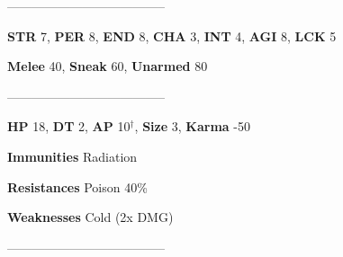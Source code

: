 \documentclass[11pt,a4paper,twocolumn]{book}
\begin{document}
	--------------------------------------

	\noindent
	\textbf{STR} 7, \textbf{PER} 8, \textbf{END} 8, \textbf{CHA} 3, \textbf{INT} 4, \textbf{AGI} 8, \textbf{LCK} 5
	
	\noindent
	\textbf{Melee} 40, \textbf{Sneak} 60, \textbf{Unarmed} 80
	
	--------------------------------------
	
	\noindent
	\textbf{HP} 18, \textbf{DT} 2, \textbf{AP} 10$^{\dag}$, \textbf{Size} 3, \textbf{Karma} -50
	
	
	\noindent
	\textbf{Immunities} Radiation%
	
	\noindent
	\textbf{Resistances} Poison 40\%%
	
	\noindent
	\textbf{Weaknesses} Cold (2x DMG) %
	
	--------------------------------------
	
\end{document}
